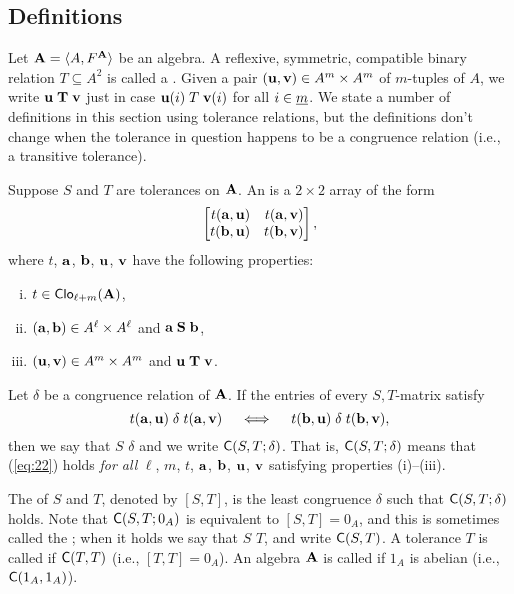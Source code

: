 \subsection{Definitions}
Let $\mathbf{A} = \langle A, F^{\mathbf{A}}\rangle$ be an algebra.
A reflexive, symmetric, compatible binary relation $T\subseteq A^2$ is called a
.  
Given a pair $(\mathbf{u}, \mathbf{v}) \in A^m\times A^m$ of $m$-tuples of $A$, we write 
$\mathbf{u} \mathrel{\mathbf{T}} \mathbf{v}$ just in case $\mathbf{u}(i) \mathrel{T} \mathbf{v}(i)$ for all $i\in \underline{m}$. 
We state a number of definitions in this section using tolerance relations, but 
the definitions don't change when the tolerance in question happens to be
a congruence relation (i.e., a transitive tolerance).

Suppose $S$ and $T$ are tolerances on $\mathbf{A}$.  An  
is a $2\times 2$ array of the form
\[
\begin{bmatrix*}[r] t(\ba,\bu) & t(\ba,\bv)\\ t(\bb,\bu)&t(\bb,\bv)\end{bmatrix*},
\]
where $t$, $\mathbf{a}$, $\mathbf{b}$, $\mathbf{u}$, $\mathbf{v}$ have the following properties:
\begin{enumerate}[(i)] %
\item $t\in \operatorname{\mathsf{Clo}}_{\ell + m}(\mathbf{A})$,
\item $(\mathbf{a}, \mathbf{b})\in A^\ell\times A^\ell$ and $\mathbf{a} \mathrel{\mathbf{S}} \mathbf{b}$,
\item $(\mathbf{u}, \mathbf{v})\in A^m\times A^m$ and $\mathbf{u} \mathrel{\mathbf{T}} \mathbf{v}$.
\end{enumerate}
Let $\delta$ be a congruence relation of $\mathbf{A}$.
If the entries of every $S,T$-matrix satisfy
\begin{equation}
  \label{eq:22}
t(\mathbf{a},\mathbf{u}) \mathrel{\delta} t(\mathbf{a},\mathbf{v})\quad \iff \quad t(\mathbf{b},\mathbf{u}) \mathrel{\delta} t(\mathbf{b},\mathbf{v}),
\end{equation}
then we say that $S$  $\delta$ and we write 
$\mathsf{C}(S, T; \delta)$.
That is, $\mathsf{C}(S, T; \delta)$  means that 
(\ref{eq:22}) holds \emph{for all}
$\ell$, $m$, $t$, $\mathbf{a}$, $\mathbf{b}$, $\mathbf{u}$, $\mathbf{v}$ satisfying properties (i)--(iii).

The  of $S$ and $T$, denoted by $[S, T]$,
is the least congruence $\delta$ such that $\mathsf{C}(S, T; \delta)$ 
holds.  
Note that $\mathsf{C}(S, T; 0_A)$ is equivalent to $[S,T] = 0_A$, and this
is sometimes called the ;
when it holds we say  that
$S$  $T$, and write $\mathsf{C}(S, T)$.
A tolerance $T$ is called  if
$\mathsf{C}(T, T)$ (i.e., $[T, T] = 0_A$).  
An algebra $\mathbf{A}$ is called  if $1_A$ is abelian
(i.e., $\mathsf{C}(1_A, 1_A)$).

